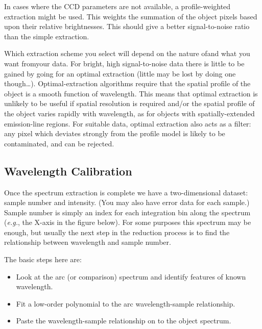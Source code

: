 In cases where the CCD parameters are not available, a profile-weighted
extraction might be used.  This weights the summation of the
object pixels based upon their relative brightnesses.
This should give a better signal-to-noise ratio than the simple
extraction.

Which extraction scheme you select will depend on the nature
of\scspec{---}{ - }and what you want from\scspec{---}{ - }your data.
For bright, high signal-to-noise data there is little to be gained
by going for an optimal extraction (little may be lost by doing one
though\ldots ).
Optimal-extraction algorithms require that the spatial profile of the
object is a smooth function of wavelength.
This means that optimal extraction is unlikely to be useful if spatial
resolution is required and/or the spatial profile of the object varies
rapidly with wavelength, as for objects with spatially-extended
emission-line regions.  For suitable data, optimal extraction also acts
as a  filter: any pixel which deviates
strongly from the profile model is likely to be contaminated, and can be
rejected.


\subsection{Wavelength Calibration}

Once the spectrum extraction is complete we have a two-dimensional
dataset: sample number and intensity.
(You may also have error data for each sample.)
Sample number is simply an index for each integration bin along the
spectrum ({\em{e.g.}}, the X-axis in 
{the figure below}).
For some purposes this spectrum may be enough, but usually
the next step in the reduction process is to find the
relationship between wavelength and sample number.

The basic steps here are:

\begin{itemize}

\item Look at the arc (or comparison) spectrum and identify
      features of known wavelength.

\item Fit a low-order polynomial to the arc wavelength-sample relationship.

\item Paste the wavelength-sample relationship on to the object spectrum.

\end{itemize}

